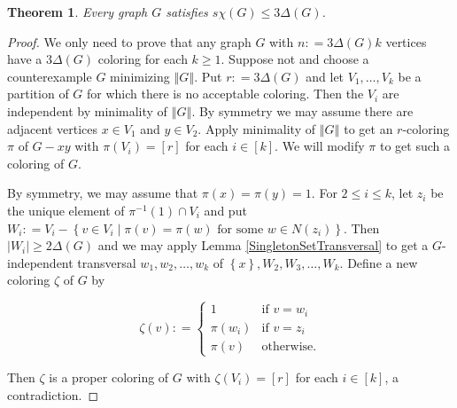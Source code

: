 \documentclass[12pt]{article}
\theoremstyle{plain}
\newtheorem{thm}{Theorem}[section]
\theoremstyle{definition}
\theoremstyle{remark}
\newcommand{\set}[1]{\left\{ #1 \right\}}
\newcommand{\setb}[3]{\left\{ #1 \in #2 \mid #3 \right\}}
\newcommand{\card}[1]{\left|#1\right|}
\newcommand{\size}[1]{\left\Vert#1\right\Vert}
\newcommand{\irange}[1]{\left[#1\right]}
\newcommand{\DefinedAs}{\mathrel{\mathop:}=}
\begin{document}
\begin{thm}\label{StrongColorBound}
Every graph $G$ satisfies $s\chi(G) \leq 3\Delta(G)$.
\end{thm}
\begin{proof}
We only need to prove that any graph $G$ with $n \DefinedAs 3\Delta(G) k$ vertices have a $3\Delta(G)$ coloring for each $k \geq 1$.  
Suppose not and choose a counterexample $G$ minimizing $\size{G}$.  Put $r \DefinedAs 3\Delta(G)$ and let $V_1, \ldots, V_k$ be a partition 
of $G$ for which there is no acceptable coloring.  Then the $V_i$ are independent by minimality of $\size{G}$. By symmetry we may assume 
there are adjacent vertices $x \in V_1$ and $y \in V_2$. Apply minimality of $\size{G}$ to get an $r$-coloring $\pi$ of $G - xy$ 
with $\pi(V_i) = \irange{r}$ for each $i \in \irange{k}$.  We will modify $\pi$ to get such a coloring of $G$.

By symmetry, we may assume that $\pi(x) = \pi(y) = 1$.  For $2 \leq i \leq k$, let $z_i$ be the unique element of $\pi^{-1}(1) \cap V_i$ and 
put $W_i \DefinedAs V_i - \setb{v}{V_i}{\pi(v) = \pi(w) \text{ for some } w \in N(z_i)}$.  Then $\card{W_i} \geq 2\Delta(G)$ and we may apply 
Lemma \ref{SingletonSetTransversal} to get a $G$-independent transversal $w_1, w_2, \ldots, w_k$ of $\set{x}, W_2, W_3, \ldots, W_k$.  
Define a new coloring $\zeta$ of $G$ by 


\begin{equation*}
\zeta(v) \DefinedAs 
\begin{cases}
1 & \text{if $v = w_i$} \\
\pi(w_i) & \text{if $v = z_i$} \\
\pi(v) & \text{otherwise.}
\end{cases}
\end{equation*}

\noindent Then $\zeta$ is a proper coloring of $G$ with $\zeta(V_i) = \irange{r}$ for each $i \in \irange{k}$, a contradiction.
\end{proof}
\end{document}

